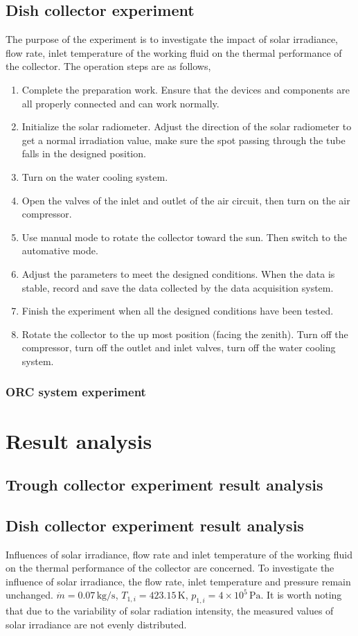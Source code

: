 \subsection{Dish collector experiment}
The purpose of the experiment is to investigate the impact of solar irradiance, flow rate, inlet temperature of the working fluid on the thermal performance of the collector. The operation steps are as follows,
\begin{enumerate}[label=(\arabic*)]
	\item Complete the preparation work. Ensure that the devices and components are all properly connected and can work normally.
	\item Initialize the solar radiometer. Adjust the direction of the solar radiometer to get a normal irradiation value, make sure the spot passing through the tube falls in the designed position.
	\item Turn on the water cooling system.
	\item Open the valves of the inlet and outlet of the air circuit, then turn on the air compressor.
	\item Use manual mode to rotate the collector toward the sun. Then switch to the automative mode.
	\item Adjust the parameters to meet the designed conditions. When the data is stable, record and save the data collected by the data acquisition system.
	\item Finish the experiment when all the designed conditions have been tested. 
	\item Rotate the collector to the up most position (facing the zenith). Turn off the compressor, turn off the outlet and inlet valves, turn off the water cooling system.
\end{enumerate}

\subsubsection{ORC system experiment}


\section{Result analysis}
\subsection{Trough collector experiment result analysis}


\subsection{Dish collector experiment result analysis}
Influences of solar irradiance, flow rate and inlet temperature of the working fluid on the thermal performance of the collector are concerned.
To investigate the influence of solar irradiance, the flow rate, inlet temperature and pressure remain unchanged. $\dot{m} = 0.07\,\mathrm{kg/s}$, $T_{1,i} = 423.15\,\mathrm{K}$, $p_{1,i} = 4\times10^5\,\mathrm{Pa}$. It is worth noting that due to the variability of solar radiation intensity, the measured values of solar irradiance are not evenly distributed.

